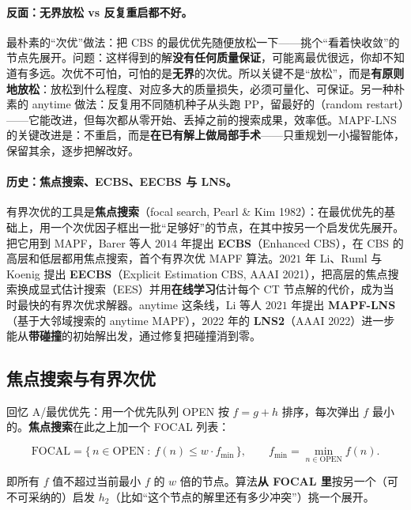 \paragraph{反面：无界放松 vs 反复重启都不好。}
最朴素的“次优”做法：把 CBS 的最优优先随便放松一下——挑个“看着快收敛”的节点先展开。问题：这样得到的解\textbf{没有任何质量保证}，可能离最优很远，你却不知道有多远。次优不可怕，可怕的是\textbf{无界}的次优。所以关键不是“放松”，而是\textbf{有原则地放松}：放松到什么程度、对应多大的质量损失，必须可量化、可保证。另一种朴素的 anytime 做法：反复用不同随机种子从头跑 PP，留最好的（random restart）——它能改进，但每次都从零开始、丢掉之前的搜索成果，效率低。MAPF-LNS 的关键改进是：不重启，而是\textbf{在已有解上做局部手术}——只重规划一小撮智能体，保留其余，逐步把解改好。

\paragraph{历史：焦点搜索、ECBS、EECBS 与 LNS。}
有界次优的工具是\textbf{焦点搜索}（focal search, Pearl \& Kim 1982）\cite{pearl1982focal}：在最优优先的基础上，用一个次优因子框出一批“足够好”的节点，在其中按另一个启发优先展开。把它用到 MAPF，Barer 等人 $2014$ 年提出 \textbf{ECBS}（Enhanced CBS），在 CBS 的高层和低层都用焦点搜索，首个有界次优 MAPF 算法\cite{barer2014ecbs}。$2021$ 年 Li、Ruml 与 Koenig 提出 \textbf{EECBS}（Explicit Estimation CBS, AAAI 2021）\cite{li2021eecbs}，把高层的焦点搜索换成显式估计搜索（EES）并用\textbf{在线学习}估计每个 CT 节点解的代价，成为当时最快的有界次优求解器。anytime 这条线，Li 等人 $2021$ 年提出 \textbf{MAPF-LNS}（基于大邻域搜索的 anytime MAPF）\cite{li2021lns}，$2022$ 年的 \textbf{LNS2}（AAAI 2022）进一步能从\textbf{带碰撞}的初始解出发，通过修复把碰撞消到零\cite{li2022lns2}。

\subsection{焦点搜索与有界次优}
\label{sec:mapf-focal}

回忆 A\*/最优优先：用一个优先队列 OPEN 按 $f=g+h$ 排序，每次弹出 $f$ 最小的。\textbf{焦点搜索}在此之上加一个 FOCAL 列表：

\begin{equation}
  \mathrm{FOCAL}=\{\,n\in\mathrm{OPEN}\ :\ f(n)\le w\cdot f_{\min}\,\},\qquad f_{\min}=\min_{n\in\mathrm{OPEN}} f(n).
  \label{eq:mapf-focal}
\end{equation}

即所有 $f$ 值不超过当前最小 $f$ 的 $w$ 倍的节点。算法\textbf{从 FOCAL 里}按另一个（可不可采纳的）启发 $h_2$（比如“这个节点的解里还有多少冲突”）挑一个展开。

